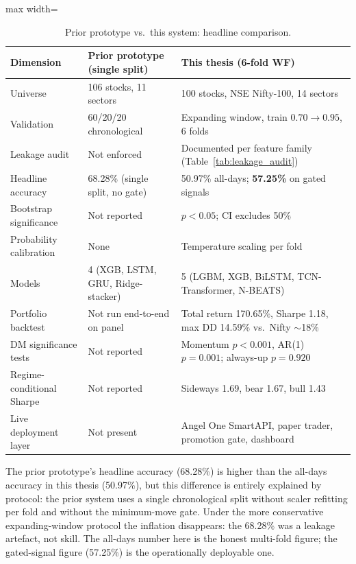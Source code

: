 \begin{table}[H]
\centering
\caption{Prior prototype vs.\ this system: headline comparison.}
\label{tab:prior_vs_this_results}
\renewcommand{\arraystretch}{1.35}
\begin{adjustbox}{max width=\textwidth}
\begin{tabular}{l l l}
\toprule
\textbf{Dimension} & \textbf{Prior prototype (single split)} & \textbf{This thesis (6-fold WF)} \\
\midrule
Universe                  & 106 stocks, 11 sectors                & 100 stocks, NSE Nifty-100, 14 sectors \\
Validation                & 60/20/20 chronological                & Expanding window, train $0.70\!\to\!0.95$, 6 folds \\
Leakage audit             & Not enforced                          & Documented per feature family (Table~\ref{tab:leakage_audit}) \\
Headline accuracy         & 68.28\% (single split, no gate)       & 50.97\% all-days; \textbf{57.25\%} on gated signals \\
Bootstrap significance    & Not reported                          & $p<0.05$; CI excludes 50\% \\
Probability calibration   & None                                  & Temperature scaling per fold \\
Models                    & 4 (XGB, LSTM, GRU, Ridge-stacker)     & 5 (LGBM, XGB, BiLSTM, TCN-Transformer, N-BEATS) \\
Portfolio backtest        & Not run end-to-end on panel           & Total return 170.65\%, Sharpe 1.18, max DD 14.59\% vs.\ Nifty $\sim$18\% \\
DM significance tests     & Not reported                          & Momentum $p<0.001$, AR(1) $p=0.001$; always-up $p=0.920$ \\
Regime-conditional Sharpe & Not reported                          & Sideways 1.69, bear 1.67, bull 1.43 \\
Live deployment layer     & Not present                           & Angel One SmartAPI, paper trader, promotion gate, dashboard \\
\bottomrule
\end{tabular}
\end{adjustbox}
\end{table}

The prior prototype's headline accuracy (68.28\%) is higher than the all-days accuracy in this thesis (50.97\%), but this difference is entirely explained by protocol: the prior system uses a single chronological split without scaler refitting per fold and without the minimum-move gate. Under the more conservative expanding-window protocol the inflation disappears: the 68.28\% was a leakage artefact, not skill. The all-days number here is the honest multi-fold figure; the gated-signal figure (57.25\%) is the operationally deployable one.

